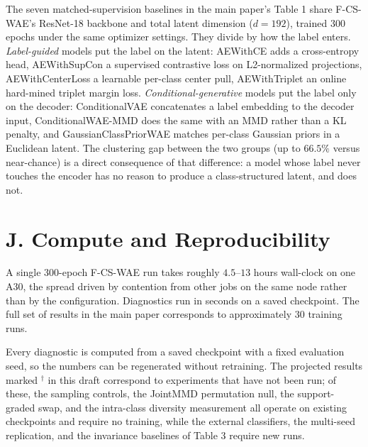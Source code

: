 \documentclass[letterpaper]{article} %
\newcommand{\ours}{F-CS-WAE}
\begin{document}
The seven matched-supervision baselines in the main paper's Table 1 share
\ours{}'s ResNet-18 backbone and total latent dimension ($d{=}192$), trained
300 epochs under the same optimizer settings. They divide by how the label
enters. \emph{Label-guided} models put the label on the latent: AEWithCE adds
a cross-entropy head, AEWithSupCon a supervised contrastive loss on
L2-normalized projections, AEWithCenterLoss a learnable per-class center pull,
AEWithTriplet an online hard-mined triplet margin loss.
\emph{Conditional-generative} models put the label only on the decoder:
ConditionalVAE concatenates a label embedding to the decoder input,
ConditionalWAE-MMD does the same with an MMD rather than a KL penalty, and
GaussianClassPriorWAE matches per-class Gaussian priors in a Euclidean latent.
The clustering gap between the two groups (up to $66.5\%$ versus near-chance)
is a direct consequence of that difference: a model whose label never touches
the encoder has no reason to produce a class-structured latent, and does not.

\section{J. Compute and Reproducibility}

A single 300-epoch \ours{} run takes roughly $4.5$--$13$ hours wall-clock on
one A30, the spread driven by contention from other jobs on the same node
rather than by the configuration. Diagnostics run in seconds on a saved
checkpoint. The full set of results in the main paper corresponds to
approximately $30$ training runs.

Every diagnostic is computed from a saved checkpoint with a fixed evaluation
seed, so the numbers can be regenerated without retraining. The projected
results marked $^{\dagger}$ in this draft correspond to experiments that have
not been run; of these, the sampling controls, the JointMMD permutation null,
the support-graded swap, and the intra-class diversity measurement all
operate on existing checkpoints and require no training, while the external
classifiers, the multi-seed replication, and the invariance baselines of
Table 3 require new runs.
\end{document}
